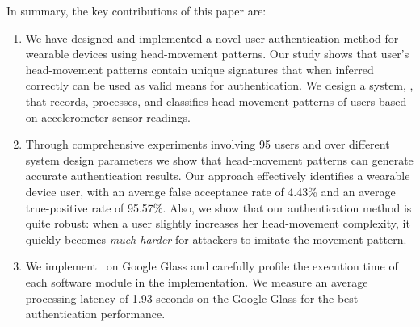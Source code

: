 
In summary, the key contributions of this paper are:

\begin{enumerate}

\item We have designed and implemented a novel user authentication method for wearable devices
using head-movement patterns. Our study shows that user's head-movement patterns
contain unique signatures that when inferred correctly can be used as valid
means for authentication. We design a system, \systemname, that records, processes, and classifies
head-movement patterns of users based on accelerometer sensor readings.


\item %
Through comprehensive experiments
involving 95 users and over
different system design parameters we show that head-movement patterns
can generate accurate authentication results. Our approach effectively identifies a wearable device user, with an average false
acceptance rate of 4.43\% and an average true-positive rate of 95.57\%. Also, we show that our authentication method is quite robust: when a user slightly increases her head-movement complexity, it quickly becomes \emph{much harder} for attackers to imitate the movement pattern.



\item We implement \systemname~on Google Glass and carefully profile the
execution time of each software module in the implementation. We measure an average processing latency of 1.93 seconds on the Google Glass for the best authentication performance.

\end{enumerate}

